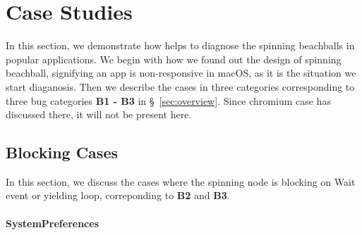 \section{Case Studies}\label{sec:casestudy}

In this section, we demonstrate how \xxx helps to diagnose the spinning
beachballs in \nbug popular applications. We begin with how we found out the
design of spinning beachball, signifying an app is non-responsive in macOS,
as it is the situation we start diaganosis. Then we describe the cases in
three categories corresponding to three bug categories \textbf{B1 - B3} in
\S~\ref{sec:overview}. Since chromium case has discussed there, it will not be
present here.







\subsection{Blocking Cases}
In this section, we discuss the cases where the spinning node is blocking on
Wait event or yielding loop, correponding to \textbf{B2} and \textbf{B3}.

\paragraph{SystemPreferences}

